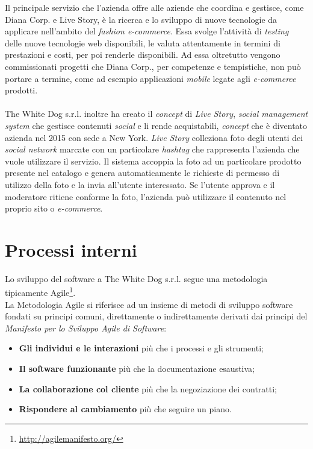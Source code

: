 Il principale servizio che l'azienda offre alle aziende che coordina e gestisce, come Diana Corp. e Live Story, è la ricerca e lo sviluppo di nuove tecnologie da applicare nell'ambito del \textit{fashion e-commerce}. Essa svolge l'attività di \textit{testing} delle nuove tecnologie web disponibili, le valuta attentamente in termini di prestazioni e costi, per poi renderle disponibili. Ad essa oltretutto vengono commissionati progetti che Diana Corp., per competenze e tempistiche, non può portare a termine, come ad esempio applicazioni \textit{mobile} legate agli \textit{e-commerce} prodotti. \\ \\
The White Dog s.r.l. inoltre ha creato il \textit{concept} di \textit{Live Story}, \textit{social management system} che gestisce contenuti \textit{social} e li rende acquistabili, \textit{concept} che è diventato azienda nel 2015 con sede a New York. \textit{Live Story} colleziona foto degli utenti dei \textit{social network} marcate con un particolare \textit{hashtag} che rappresenta l'azienda che vuole utilizzare il servizio. Il sistema accoppia la foto ad un particolare prodotto presente nel catalogo e genera automaticamente le richieste di permesso di utilizzo della foto e la invia all'utente interessato. Se l'utente approva e il moderatore ritiene conforme la foto, l'azienda può utilizzare il contenuto nel proprio sito o \textit{e-commerce}.

\section{Processi interni}

Lo sviluppo del software a The White Dog s.r.l. segue una metodologia tipicamente Agile\footnote[3]{\url{http://agilemanifesto.org/}}. \\ 
La Metodologia Agile si riferisce ad un insieme di metodi di sviluppo software fondati su principi comuni, direttamente o indirettamente derivati dai principi del \textit{Manifesto per lo Sviluppo Agile di Software}: 

\begin{itemize}
	\item \textbf{Gli individui e le interazioni} più che i processi e gli strumenti;
	\item \textbf{Il software funzionante} più che la documentazione esaustiva;
	\item \textbf{La collaborazione col cliente} più che la negoziazione dei contratti;
	\item \textbf{Rispondere al cambiamento} più che seguire un piano.
\end{itemize}


